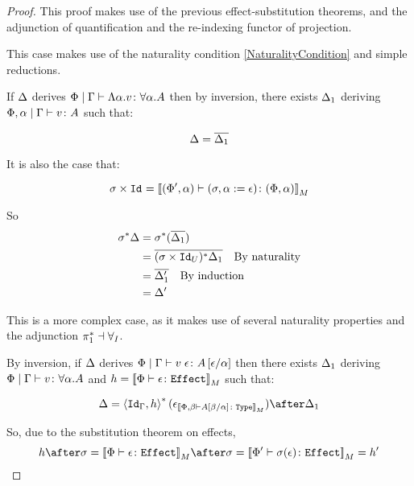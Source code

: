\documentclass{Report}
\begin{document}
\begin{proof}
    This proof makes use of the previous effect-substitution theorems, and the adjunction of quantification and the re-indexing functor of projection.



This case makes use of the naturality condition \ref{NaturalityCondition} and simple reductions.

If $\Delta$ derives $\Phi\mid\Gamma \vdash \Lambda \alpha. v \colon \forall \alpha. A$ then by inversion, there exists $\Delta_1$ deriving  $\Phi,\alpha\mid\Gamma \vdash v \colon A$ such that:

\begin{equation}
    \Delta = \overline{\Delta_1}\\
\end{equation}

It is also the case that:

\begin{equation}
    \sigma\times\texttt{Id}_{} = {\bf [\![}(\Phi',\alpha) \vdash (\sigma, \alpha:=\epsilon) \colon (\Phi,\alpha){\bf ]\!]}_M
\end{equation}

So
\begin{align}
    \sigma^*\Delta &= \sigma^*(\overline{\Delta_1})\\
    & = \overline{(\sigma\times\texttt{Id}_{U})^*\Delta_1}\quad\text{By naturality}\\
    & = \overline{\Delta_1'}\quad\text{By induction}\\
    & = \Delta'
\end{align}


This is a more complex case, as it makes use of several naturality properties and the adjunction $\pi_1^*\dashv\forall_I$.


By inversion, if $\Delta$ derives $\Phi\mid\Gamma \vdash v\;\epsilon \colon A\left[\epsilon / \alpha\right]$ then there exists $\Delta_1$ deriving $\Phi\mid\Gamma \vdash v \colon \forall \alpha. A$ and $h = {\bf [\![}\Phi \vdash \epsilon \colon \texttt{Effect}{\bf ]\!]}_M$ such that:

\begin{equation}
    \D = \pr{\Id{\G}}{h}\star(\e_{\deno{\typerelation{\P,\b}{A\ssub{\a}{\b}}{\type}}})\after\D_1\\
\end{equation}

So, due to the substitution theorem on effects,
\begin{equation}
    h\after\si = \deno{\typerelation{\P}{\e}{\effect}}\after\si = \deno{\typerelation{\P'}{\si(\e)}{\effect}} = h'
\end{equation}


\end{proof}
\end{document}
